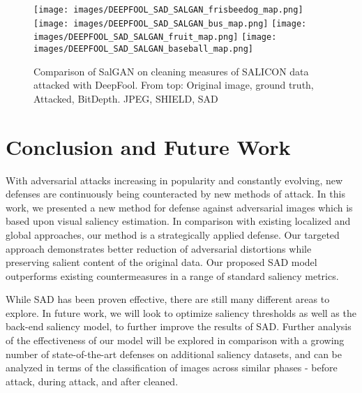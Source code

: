 \documentclass[10pt,twocolumn,letterpaper]{article}
\begin{document}
\begin{figure}[hbt]
\texttt{[image: images/DEEPFOOL\_SAD\_SALGAN\_frisbeedog\_map.png]}
  \texttt{[image: images/DEEPFOOL\_SAD\_SALGAN\_bus\_map.png]}
  \texttt{[image: images/DEEPFOOL\_SAD\_SALGAN\_fruit\_map.png]}
  \texttt{[image: images/DEEPFOOL\_SAD\_SALGAN\_baseball\_map.png]}
  
  
  
  \caption{Comparison of SalGAN\cite{Pan_2017_SalGAN} on cleaning measures of SALICON\cite{jiang2015salicon} data attacked with DeepFool\cite{deepfool}.
             From top: Original image, ground truth, Attacked, BitDepth. JPEG, SHIELD\cite{das2018shield}, SAD
  }
  \label{fig:results_salicon}
\end{figure}
 

\section{Conclusion and Future Work}

With adversarial attacks increasing in popularity and constantly evolving, new defenses are continuously being counteracted by new methods of attack.
In this work, we presented a new method for defense against adversarial images which is based upon visual saliency estimation.
In comparison with existing localized and global approaches, our method is a strategically applied defense.
Our targeted approach demonstrates better reduction of adversarial distortions while preserving salient content of the original data.
Our proposed SAD model outperforms existing countermeasures in a range of standard saliency metrics.

While SAD has been proven effective, there are still many different areas to explore.
In future work, we will look to optimize saliency thresholds as well as the back-end saliency model, to further improve the results of SAD. 
Further analysis of the effectiveness of our model will be explored in comparison with a growing number of state-of-the-art defenses on additional saliency datasets, and can be analyzed in terms of the classification of images across similar phases - before attack, during attack, and after cleaned.
%
 

\clearpage
{\small


}
\end{document}
